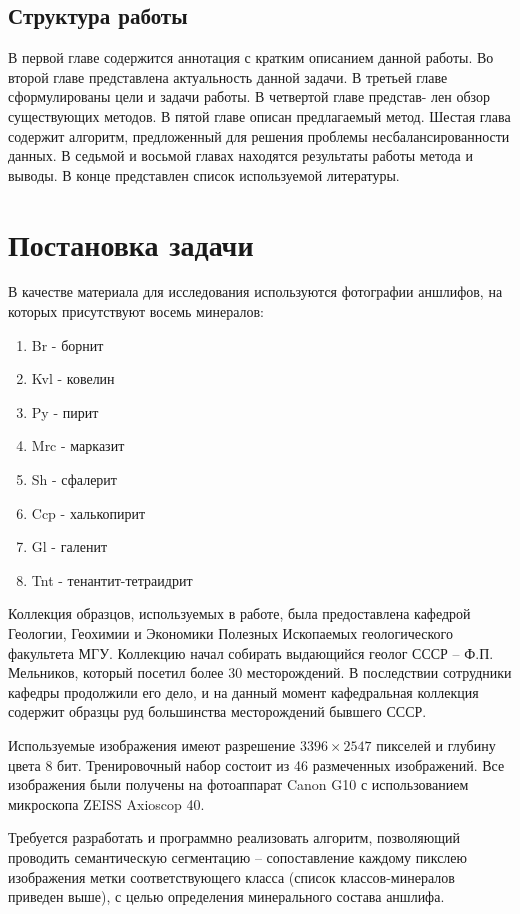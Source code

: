 \subsection{Структура работы}
В первой главе содержится аннотация с кратким описанием данной работы. Во второй главе представлена актуальность данной задачи. В третьей главе сформулированы цели и задачи работы. В четвертой главе представ- лен обзор существующих методов. В пятой главе описан предлагаемый метод. Шестая глава содержит алгоритм, предложенный для решения проблемы несбалансированности данных. В седьмой и восьмой главах находятся результаты работы метода и выводы. В конце представлен список используемой литературы.

\newpage
\section{Постановка задачи}
В качестве материала для исследования используются фотографии аншлифов, на которых присутствуют восемь минералов:
\begin{enumerate}[nosep]
    \item Br - борнит
    \item Kvl - ковелин
    \item Py - пирит
    \item Mrc - марказит
    \item Sh - сфалерит
    \item Ccp - халькопирит
    \item Gl - галенит
    \item Tnt - тенантит-тетраидрит
\end{enumerate}
\par
Коллекция образцов, используемых в работе, была предоставлена кафедрой Геологии,
Геохимии и Экономики Полезных Ископаемых геологического факультета МГУ.
Коллекцию начал собирать выдающийся геолог СССР – Ф.П. Мельников, который посетил
более 30 месторождений. В последствии сотрудники кафедры продолжили его дело, и на
данный момент кафедральная коллекция содержит образцы руд большинства
месторождений бывшего СССР. 
\par Используемые изображения имеют разрешение $3396 \times 2547$ пикселей и глубину цвета 8 бит. Тренировочный набор состоит из 46 размеченных изображений. Все изображения были получены на фотоаппарат Canon G10 с использованием микроскопа ZEISS Axioscop 40.
\par
Требуется разработать и программно реализовать алгоритм, позволяющий проводить семантическую сегментацию -- сопоставление каждому пикслею изображения метки соответствующего класса (список классов-минералов приведен выше), с целью определения минерального состава аншлифа. 
